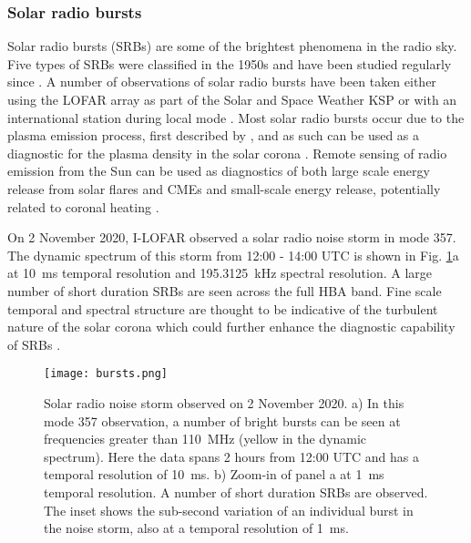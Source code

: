 \subsubsection{Solar radio bursts}
Solar radio bursts (SRBs) are some of the brightest phenomena in the radio sky. Five types of SRBs were classified in the 1950s \citep{Wild1950b, Boischot1957, Wild1959} and have been studied regularly since \citep[See][for a comprehensive review]{Pick2008}. A number of observations of solar radio bursts have been taken either using the LOFAR array as part of the Solar and Space Weather KSP \citep[for example,][]{Zhang2020, Murphy2021} or with an international station during local mode \citep[for example,][]{Morosan2019, Maguire2020, Bartosz2020}. Most solar radio bursts occur due to the plasma emission process, first described by \cite{Ginzburg1958}, and as such can be used as a diagnostic for the plasma density in the solar corona \citep{Melrose1987}. Remote sensing of radio emission from the Sun can be used as diagnostics of both large scale energy release from solar flares and CMEs \citep{Carley2021} and small-scale energy release, potentially related to coronal heating \citep{Mondal2020}.

On 2 November 2020, I-LOFAR observed a solar radio noise storm in mode 357. The dynamic spectrum of this storm from 12:00 - 14:00 UTC is shown in Fig. \ref{fig:357_10ms}a at 10~ms temporal resolution and \SI{195.3125}{\kilo \hertz} spectral resolution. A large number of short duration SRBs are seen across the full HBA band. Fine scale temporal and spectral structure are thought to be indicative of the turbulent nature of the solar corona which could further enhance the diagnostic capability of SRBs \citep{Kolotkov2018, Sharykin2018b, Reid2021}.

\begin{figure}
    \centering
    \texttt{[image: bursts.png]}
    \caption[Solar radio noise storm observed on 2 November 2020.]{Solar radio noise storm observed on 2 November 2020. a) In this mode 357 observation, a number of bright bursts can be seen at frequencies greater than 110~MHz (yellow in the dynamic spectrum). %
    Here the data spans 2 hours from 12:00 UTC and has a temporal resolution of 10~ms.
    b) Zoom-in of panel a at 1~ms temporal resolution. A number of short duration SRBs are observed. The inset shows the sub-second variation of an individual burst in the noise storm, also at a temporal resolution of 1~ms.}
    \label{fig:357_10ms}
\end{figure}

